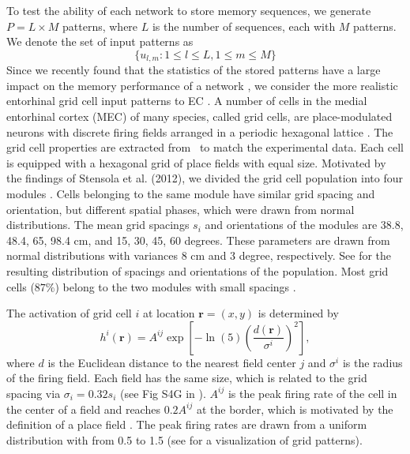 \documentclass[utf8]{frontiersSCNS} %
\begin{document}
To test the ability of each network to store memory sequences, we generate $P = L \times M$ patterns, where $L$ is the number of sequences, each with $M$ patterns. We denote the set of input patterns as 
\begin{equation}
	\{ u_{l,m}: 1\le l \le L, 1\le m \le M \}
\end{equation}
Since we recently found that the statistics of the stored patterns have a large impact on the memory performance of a network \cite{neher2015memory}, we consider the more realistic entorhinal grid cell input patterns to EC \cite{hafting2005microstructure}. 
%
A number of cells in the medial entorhinal cortex (MEC) of many species, called grid cells, are place-modulated neurons with discrete firing fields arranged in a periodic hexagonal lattice \cite{hafting2005microstructure}.  
%
The grid cell properties are extracted from~\cite{stensola2012entorhinal} to match the experimental data.
Each cell is equipped with a hexagonal grid of place fields with equal size.
%
Motivated by the findings of Stensola et al. (2012), we divided the grid cell population into four modules \cite{stensola2012entorhinal}. Cells belonging to the same module have similar grid spacing and orientation, but different spatial phases, which were drawn from normal distributions. 
%
The mean grid spacings $s_i$ and orientations of the modules are 38.8, 48.4, 65, 98.4 cm, and 15, 30, 45, 60 degrees. These parameters are drawn from normal distributions with variances 8 cm and 3 degree, respectively.
%
See \cite[Fig 1B-1C]{neher2015memory} for the resulting distribution of spacings and orientations of the population.
%
Most grid cells ($87\%$) belong to the two modules with small spacings \cite{stensola2012entorhinal}. 

The activation of grid cell $i$ at location $\mathbf{r}=(x,y)$ is determined by
\begin{equation}
\label{eq:grid}
h^i(\mathbf{r}) = A^{ij} \exp \left[ -\ln(5) \left(\frac{d(\mathbf{r})}{\sigma^i}\right)^2 \right],
\end{equation}
where $d$ is the Euclidean distance to the nearest field center $j$ and $\sigma^i$ is the radius of the firing field.
%
Each field has the same size, which is related to the grid spacing via $ \sigma_i  = 0.32 s_i $ (see Fig
S4G in \cite{hafting2005microstructure}). 
%
$A^{ij}$ is the peak firing rate of the cell in the center of a field and reaches $0.2 A^{ij}$ at the border, which is motivated by the definition of a place field \cite{hafting2005microstructure}. The peak firing rates are drawn from a uniform distribution with from 0.5 to 1.5 (see \cite{neher2015memory} for a visualization of grid patterns).  
%
\end{document}
